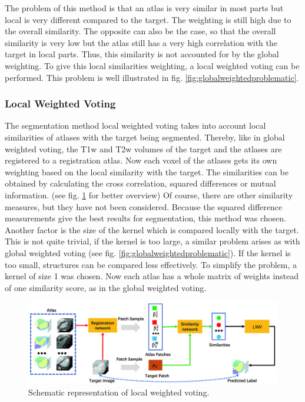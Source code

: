 The problem of this method is that an atlas is very similar in most parts but local is very different compared to the target. The weighting is still high due to the overall similarity. The opposite can also be the case, so that the overall similarity is very low but the atlas still has a very high correlation with the target in local parts. Thus, this similarity is not accounted for by the global weighting. To give this local similarities weighting, a local weighted voting can be performed. This problem is well illustrated in fig. \ref{fig:globalweightedproblematic}.

\subsubsection*{Local Weighted Voting}
The segmentation method local weighted voting takes into account local similarities of atlases with the target being segmented. Thereby, like in global weighted voting, the T1w and T2w volumes of the target and the atlases are registered to a registration atlas. Now each voxel of the atlases gets its own weighting based on the local similarity with the target. The similarities can be obtained by calculating the cross correlation, squared differences or mutual information. (see fig. \ref{fig:localWeightedVoting} for better overview) Of course, there are other similarity measures, but they have not been considered. Because the squared difference measurements give the best results for segmentation, this method was chosen\cite{b2}. Another factor is the size of the kernel which is compared locally with the target. This is not quite trivial, if the kernel is too large, a similar problem arises as with global weighted voting (see fig. \ref{fig:globalweightedproblematic}). If the kernel is too small, structures can be compared less effectively. To simplify the problem, a kernel of size 1 was chosen. Now each atlas has a whole matrix of weights instead of one similarity score, as in the global weighted voting.

\begin{figure}[h!]
	\centering
	\includegraphics[width=0.8\linewidth]{img/localWeightedVoting}
	\caption{Schematic representation of local weighted voting.}
	\label{fig:localWeightedVoting}
\end{figure}

